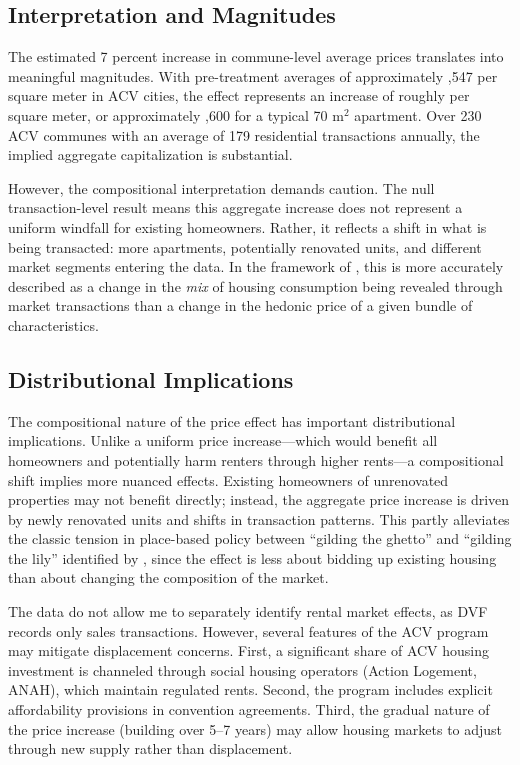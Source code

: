 \documentclass[12pt]{article}
\newcommand{\euro}{\texteuro}
\begin{document}
\subsection{Interpretation and Magnitudes}

The estimated 7 percent increase in commune-level average prices translates into meaningful magnitudes. With pre-treatment averages of approximately \euro 1,547 per square meter in ACV cities, the effect represents an increase of roughly \euro 108 per square meter, or approximately \euro 7,600 for a typical 70 m$^2$ apartment. Over 230 ACV communes with an average of 179 residential transactions annually, the implied aggregate capitalization is substantial.

However, the compositional interpretation demands caution. The null transaction-level result means this aggregate increase does not represent a uniform windfall for existing homeowners. Rather, it reflects a shift in what is being transacted: more apartments, potentially renovated units, and different market segments entering the data. In the framework of \citet{rosen1974hedonic}, this is more accurately described as a change in the \textit{mix} of housing consumption being revealed through market transactions than a change in the hedonic price of a given bundle of characteristics.

\subsection{Distributional Implications}

The compositional nature of the price effect has important distributional implications. Unlike a uniform price increase---which would benefit all homeowners and potentially harm renters through higher rents---a compositional shift implies more nuanced effects. Existing homeowners of unrenovated properties may not benefit directly; instead, the aggregate price increase is driven by newly renovated units and shifts in transaction patterns. This partly alleviates the classic tension in place-based policy between ``gilding the ghetto'' and ``gilding the lily'' identified by \citet{kline2014people}, since the effect is less about bidding up existing housing than about changing the composition of the market.

The data do not allow me to separately identify rental market effects, as DVF records only sales transactions. However, several features of the ACV program may mitigate displacement concerns. First, a significant share of ACV housing investment is channeled through social housing operators (Action Logement, ANAH), which maintain regulated rents. Second, the program includes explicit affordability provisions in convention agreements. Third, the gradual nature of the price increase (building over 5--7 years) may allow housing markets to adjust through new supply rather than displacement.
\end{document}
